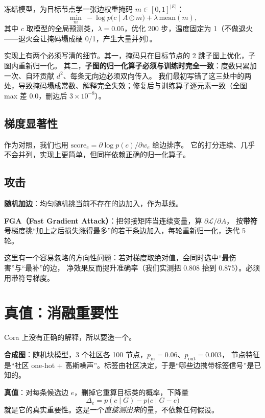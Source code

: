 \documentclass[a4paper,10pt]{article}
\begin{document}
冻结模型，为目标节点学一张边权重掩码 $m\in[0,1]^{|E|}$：
\begin{equation}
\min_m\ -\log p\bigl(c\mid A\odot m\bigr)+\lambda\,\mathrm{mean}(m),
\end{equation}
其中 $c$ 取模型的全局预测类，$\lambda=0.05$，优化 200 步，温度固定为 1（不做退火——退火会让掩码塌成硬 0/1，产生大量并列）。

实现上有两个必须写清的细节。其一，掩码只在目标节点的 2 跳子图上优化，子图内重新归一化。
其二，\textbf{子图的归一化算子必须与训练时完全一致}：度数只累加一次、自环贡献 $d^2$、每条无向边必须双向传入。
我们最初写错了这三处中的两处，导致掩码塌成常数、解释完全失效；修复后与训练算子逐元素一致（全图 max 差 $0.0$，删边后 $3\times10^{-8}$）。

\subsection{梯度显著性}

作为对照，我们也用 $\mathrm{score}_e=\partial\log p(c)/\partial w_e$ 给边排序。
它的打分连续、几乎不会并列，实现上更简单，但同样依赖正确的归一化算子。

\subsection{攻击}

\textbf{随机加边}：均匀随机挑当前不存在的边加入，作为基线。

\textbf{FGA（Fast Gradient Attack）}：把邻接矩阵当连续变量，算 $\partial \mathcal L/\partial A$，
按\textbf{带符号}梯度挑“加上之后损失涨得最多”的若干条边加入，每轮重新归一化，迭代 5 轮。

这里有一个容易忽略的方向性问题：若对梯度取绝对值，会同时选中“最伤害”与“最补”的边，
净效果反而提升准确率（我们实测把 0.808 抬到 0.875）。必须用带符号梯度。

\section{真值：消融重要性}\label{sec:truth}

Cora 上没有正确的解释，所以要造一个。

\textbf{合成图}：随机块模型，3 个社区各 100 节点，$p_{\text{in}}=0.06$、$p_{\text{out}}=0.003$，
节点特征是“社区 one-hot + 高斯噪声”。标签由社区决定，于是“哪些边携带标签信号”是已知的。

\textbf{真值}：对每条候选边 $e$，删掉它重算目标类的概率，下降量
\begin{equation}
\Delta_e = p(c\mid G) - p\bigl(c\mid G-e\bigr)
\end{equation}
就是它的真实重要性。这是一个\emph{直接测出来}的量，不依赖任何假设。
\end{document}
